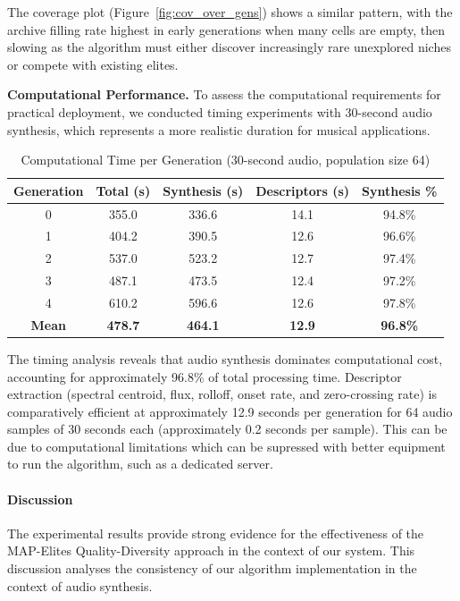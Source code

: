 The coverage plot (Figure~\ref{fig:cov_over_gens}) shows a similar pattern, with the archive filling rate highest in early generations when many cells are empty, then slowing as the algorithm must either discover increasingly rare unexplored niches or compete with existing elites.

\textbf{Computational Performance.}
To assess the computational requirements for practical deployment, we conducted timing experiments with 30-second audio synthesis, which represents a more realistic duration for musical applications.

\begin{table}[htbp]
\centering
\caption{Computational Time per Generation (30-second audio, population size 64)}
\label{tab:timing}
\begin{tabular}{ccccc}
\toprule
\textbf{Generation} & \textbf{Total (s)} & \textbf{Synthesis (s)} & \textbf{Descriptors (s)} & \textbf{Synthesis \%} \\
\midrule
0 & 355.0 & 336.6 & 14.1 & 94.8\% \\
1 & 404.2 & 390.5 & 12.6 & 96.6\% \\
2 & 537.0 & 523.2 & 12.7 & 97.4\% \\
3 & 487.1 & 473.5 & 12.4 & 97.2\% \\
4 & 610.2 & 596.6 & 12.6 & 97.8\% \\
\midrule
\textbf{Mean} & \textbf{478.7} & \textbf{464.1} & \textbf{12.9} & \textbf{96.8\%} \\
\bottomrule
\end{tabular}
\end{table}

The timing analysis reveals that audio synthesis dominates computational cost, accounting for approximately 96.8\% of total processing time. Descriptor extraction (spectral centroid, flux, rolloff, onset rate, and zero-crossing rate) is comparatively efficient at approximately 12.9 seconds per generation for 64 audio samples of 30 seconds each (approximately 0.2 seconds per sample). This can be due to computational limitations which can be supressed with better equipment to run the algorithm, such as a dedicated server.




\paragraph{Discussion}

The experimental results provide strong evidence for the effectiveness of the MAP-Elites Quality-Diversity approach in the context of our system. This discussion analyses the consistency of our algorithm implementation in the context of audio synthesis.

